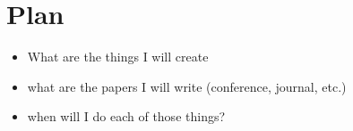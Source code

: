 \chapter{Plan}
\label{ch:plan}

\begin{itemize}
	\item What are the things I will create
	\item what are the papers I will write (conference, journal, etc.)
	\item when will I do each of those things?
\end{itemize}
